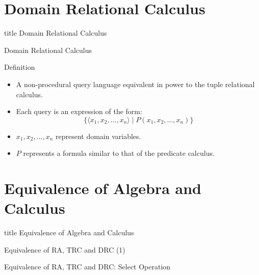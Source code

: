\documentclass[aspectratio=169, xcolor=dvipsnames]{beamer}
\begin{document}
\section{Domain Relational Calculus}
\begin{frame}
  \vfill
  \centering
  \begin{beamercolorbox}[sep=8pt,center,shadow=true,rounded=true]{title}
    Domain Relational Calculus\par%
  \end{beamercolorbox}
  \vfill
\end{frame}

\begin{frame}{Domain Relational Calculus}
    \begin{block}{Definition}
        \begin{itemize}[<+->]
            \item A non-procedural query language equivalent in power to the tuple relational calculus.
            \item Each query is an expression of the form:
            \[ \{\langle x_1, x_2, \dots, x_n \rangle \mid P(x_1, x_2, \dots, x_n)\} \]
            \item $x_1, x_2, \dots, x_n$ represent domain variables.
            \item $P$ represents a formula similar to that of the predicate calculus.
        \end{itemize}
    \end{block}
\end{frame}

\section{Equivalence of Algebra and Calculus}
\begin{frame}
  \vfill
  \centering
  \begin{beamercolorbox}[sep=8pt,center,shadow=true,rounded=true]{title}
    Equivalence of Algebra and Calculus\par%
  \end{beamercolorbox}
  \vfill
\end{frame}

\begin{frame}{Equivalence of RA, TRC and DRC (1)}
\end{frame}

\begin{frame}{Equivalence of RA, TRC and DRC: Select Operation}
\end{frame}
\end{document}
